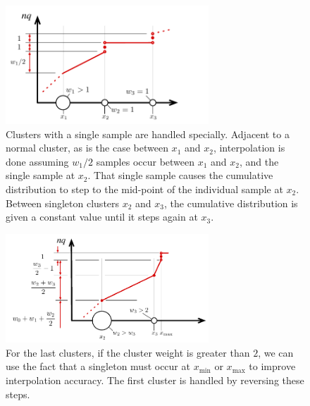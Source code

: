 \documentclass[]{statsoc}
\begin{document}
\begin{figure}[p] %
   \centering
   \includegraphics[width=3in]{figures/singleton.pdf} 
   \caption{Clusters with a single sample are handled specially. Adjacent to a normal cluster, as is the case between $x_1$ and $x_2$, interpolation is done assuming $w_1/2$ samples occur between $x_1$ and $x_2$, and the single sample at $x_2$. That single sample causes the cumulative distribution to step to the mid-point of the individual sample at $x_2$. Between singleton clusters $x_2$ and $x_3$, the cumulative distribution is given a constant value until it steps again at $x_3$.}
   \label{fig:singletons}
\end{figure}
\begin{figure}[p] %
   \centering
   \includegraphics[width=3in]{figures/endpoint.pdf} 
   \caption{For the last clusters, if the cluster weight is greater than $2$, we can use the fact that a singleton must occur at $x_{\mathrm {min}}$ or $x_{\mathrm {max}}$ to improve interpolation accuracy. The first cluster is handled by reversing these steps.}
   \label{fig:endpoint}
\end{figure}
\end{document}
